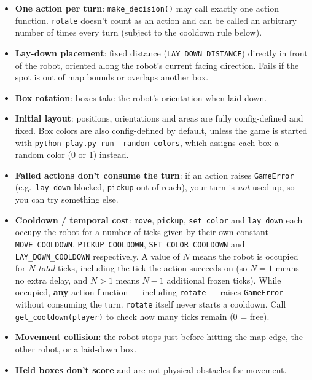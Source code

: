 \documentclass[11pt,a4paper]{article}
\newcommand{\code}[1]{\texttt{#1}}
\newcommand{\func}[1]{\texttt{#1}}
\begin{document}
\begin{itemize}
    \item \textbf{One action per turn}: \func{make\_decision()} may call
          exactly one action function. \func{rotate} doesn't count as an action
          and can be called an arbitrary number of times every turn (subject
          to the cooldown rule below).
    \item \textbf{Lay-down placement}: fixed distance
          (\code{LAY\_DOWN\_DISTANCE}) directly in front of the robot,
          oriented along the robot's current facing direction. Fails if the spot is out
          of map bounds or overlaps another box.
    \item \textbf{Box rotation}: boxes take the
          robot's orientation when laid down.
    \item \textbf{Initial layout}: positions, orientations and areas are
          fully config-defined and fixed. Box colors are also config-defined
          by default, unless the game is started with
          \code{python play.py run --random-colors}, which assigns each box
          a random color (0 or 1) instead.
    \item \textbf{Failed actions don't consume the turn}: if an action
          raises \code{GameError} (e.g.\ \func{lay\_down} blocked,
          \func{pickup} out of reach), your turn is \emph{not} used up, so
          you can try something else.
    \item \textbf{Cooldown / temporal cost}: \func{move}, \func{pickup},
          \func{set\_color} and \func{lay\_down} each occupy the robot for a
          number of ticks given by their own constant ---
          \code{MOVE\_COOLDOWN}, \code{PICKUP\_COOLDOWN},
          \code{SET\_COLOR\_COOLDOWN} and
          \code{LAY\_DOWN\_COOLDOWN} respectively. A value of $N$ means
          the robot is occupied for $N$ \emph{total} ticks, including the
          tick the action succeeds on (so $N=1$ means no extra delay, and
          $N>1$ means $N-1$ additional frozen ticks). While occupied,
          \textbf{any} action function --- including \func{rotate} --- raises
          \code{GameError} without consuming the turn. \func{rotate} itself
          never starts a cooldown. Call \func{get\_cooldown(player)} to check
          how many ticks remain (0 = free).
    \item \textbf{Movement collision}: the robot stops just before hitting
          the map edge, the other robot, or a laid-down box.
    \item \textbf{Held boxes don't score} and are not physical obstacles
          for movement.
\end{itemize}
\end{document}
